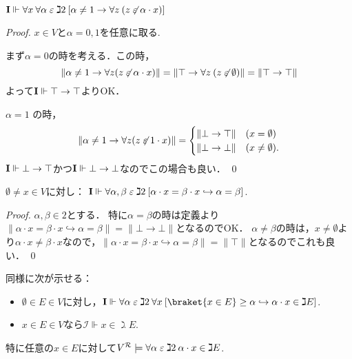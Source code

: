 \documentclass[realisability.tex]{subfiles}
\begin{document}
\begin{lemma}\label{lem:nontriv-adds-atom}
 $\mathsf{\mathbf{I}} \Vdash \forall x \: \forall \alpha \mathrel{\varepsilon} \gimel 2\: [ \alpha \neq 1 \to \forall z \: (z \not\mathrel{\varepsilon} \alpha \cdot x)]$
\end{lemma}
\begin{proof}
 $x \in V$と$\alpha = 0, 1$を任意に取る.

 まず$\alpha = 0$の時を考える．この時，
 \[
    \|\alpha \neq 1 \to \forall z (z \not\mathrel{\varepsilon} \alpha \cdot x)\|
  = \|\top \to \forall z \: (z \not\mathrel{\varepsilon} \emptyset)\|
  = \|\top \to \top\|
 \]
 よって$\mathsf{\mathbf{I}} \Vdash \top \to \top$よりOK．

 $\alpha = 1$ の時，
 \[
    \|\alpha \neq 1 \to \forall z (z \not\mathrel{\varepsilon} 1 \cdot x)\|
  =
 \begin{cases}
  \|\bot \to \top\| & (x = \emptyset)\\
  \|\bot \to \bot\| & (x \neq \emptyset).
 \end{cases}
 \]
 $\mathsf{\mathbf{I}} \Vdash \bot \to \top$かつ$\mathsf{\mathbf{I}} \Vdash \bot \to \bot$なのでこの場合も良い． \qed
\end{proof}

\begin{lemma}
 $\emptyset \neq x \in V$に対し：
 $\mathsf{\mathbf{I}} \Vdash \forall \alpha, \beta \mathrel{\varepsilon} \gimel 2 \: [\alpha \cdot x = \beta \cdot x \hookrightarrow \alpha = \beta]$.
\end{lemma}
\begin{proof}
 $\alpha, \beta \in 2$とする．
 特に$\alpha = \beta$の時は定義より$\|\alpha \cdot x = \beta \cdot x \hookrightarrow \alpha = \beta\| = \|\bot \to \bot\|$となるのでOK．
 $\alpha \neq \beta$の時は，$x \neq \emptyset$より$\alpha \cdot x \neq \beta \cdot x$なので，$\|\alpha \cdot x = \beta \cdot x \hookrightarrow \alpha = \beta\| = \|\top\|$となるのでこれも良い． \qed
\end{proof}
同様に次が示せる：
\begin{lemma}\label{lem:g2-upwd-cl}
 \begin{itemize}
  \item $\emptyset \in E \in V$に対し，$\comb{I} \Vdash \forall \alpha \strin \gimel 2 \: \forall x \:[ \braket{x \in E} \geq \alpha \hookrightarrow \alpha \cdot x \in \gimel E ]$.
  \item $x \in E \in V$なら$\mathcal{I} \Vdash x \in \gimel E$.
 \end{itemize}
 特に任意の$x \in E$に対して$V^{\mathcal{R}} \models \forall \alpha \mathrel{\varepsilon} \gimel 2 \: \alpha \cdot x \in \gimel E$.
\end{lemma}
\end{document}
